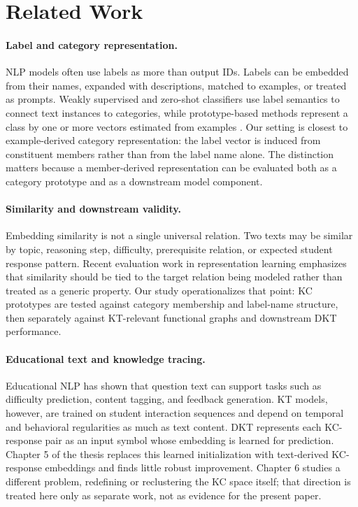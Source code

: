 \section{Related Work}
\paragraph{Label and category representation.}
NLP models often use labels as more than output IDs. Labels can be embedded from their names, expanded with descriptions, matched to examples, or treated as prompts. Weakly supervised and zero-shot classifiers use label semantics to connect text instances to categories, while prototype-based methods represent a class by one or more vectors estimated from examples \citep{snell2017prototypical,reimers2019sentencebert,meng2020lotclass}. Our setting is closest to example-derived category representation: the label vector is induced from constituent members rather than from the label name alone. The distinction matters because a member-derived representation can be evaluated both as a category prototype and as a downstream model component.

\paragraph{Similarity and downstream validity.}
Embedding similarity is not a single universal relation. Two texts may be similar by topic, reasoning step, difficulty, prerequisite relation, or expected student response pattern. Recent evaluation work in representation learning emphasizes that similarity should be tied to the target relation being modeled rather than treated as a generic property. Our study operationalizes that point: KC prototypes are tested against category membership and label-name structure, then separately against KT-relevant functional graphs and downstream DKT performance.

\paragraph{Educational text and knowledge tracing.}
Educational NLP has shown that question text can support tasks such as difficulty prediction, content tagging, and feedback generation. KT models, however, are trained on student interaction sequences and depend on temporal and behavioral regularities as much as text content. DKT \citep{piech2015dkt} represents each KC-response pair as an input symbol whose embedding is learned for prediction. Chapter 5 of the thesis replaces this learned initialization with text-derived KC-response embeddings and finds little robust improvement. Chapter 6 studies a different problem, redefining or reclustering the KC space itself; that direction is treated here only as separate work, not as evidence for the present paper.

